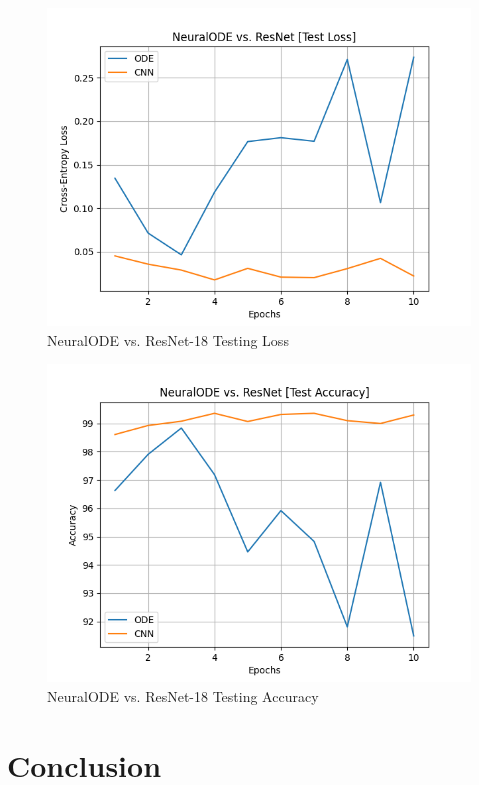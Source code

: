 \documentclass{article}
\begin{document}
\begin{figure}[H]
   \centering
   \includegraphics[width=\columnwidth]
   {./TestLoss.png}
   \caption{NeuralODE vs. ResNet-18 Testing Loss}
   \label{fig:my_label}
\end{figure}

\begin{figure}[H]
   \centering
   \includegraphics[width=\columnwidth]
   {./TestAccuracy.png}
   \caption{NeuralODE vs. ResNet-18 Testing Accuracy}
   \label{fig:my_label}
\end{figure}

\section{Conclusion}
\end{document}
